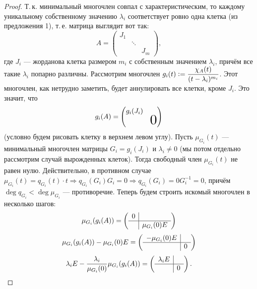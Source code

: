 \begin{proof}
    Т.\,к. минимальный многочлен совпал с характеристическим, то каждому уникальному собственному значению $\lambda_i$ соответствует ровно одна клетка (из предложения 1), т.\,е. матрица выглядит вот так:
    \[
        A =
        \begin{pmatrix}
            J_1 & & \\
             & \ddots & \\
             & & J_m
        \end{pmatrix},
    \]
    где $J_i$ --- жорданова клетка размером $m_i$ с собственным значением $\lambda_i$, причём все такие $\lambda_i$ попарно различны. Рассмотрим многочлен $\displaystyle g_i(t) \vcentcolon = \frac{\chi_A(t)}{(t - \lambda_i)^{m_i}}$. Этот многочлен, как нетрудно заметить, будет аннулировать все клетки, кроме $J_i$. Это значит, что
    \[
        g_i(A) =
        \begin{pmatrix}
            g_i(J_i) & \\
             & \scalebox{2}{$0$}
        \end{pmatrix}
    \]
    (условно будем рисовать клетку в верхнем левом углу). Пусть $\mu_{G_i}(t)$ --- минимальный многочлен матрицы $G_i = g_i(J_i)$ и $\lambda_i \ne 0$ (мы потом отдельно рассмотрим случай вырожденных клеток). Тогда свободный член $\mu_{G_i}(t)$ не равен нулю. Действительно, в противном случае $\mu_{G_i}(t) = q_{G_i}(t) \cdot t \Rightarrow q_{G_i}(G_i)G_i = 0 \Rightarrow q_{G_i}(G_i) = 0 G_i^{-1} = 0$, причём $\deg q_{G_i} < \deg \mu_{G_i}$ --- противоречие. Теперь будем строить искомый многочлен в несколько шагов:
    \[
        \mu_{G_i}(g_i(A)) =
        \left(
        \begin{array}{c | c}
            0 & \\
            \hline
             & \mu_{G_i}(0)E
        \end{array}
        \right)
    \]
    \[
        \mu_{G_i}(g_i(A)) - \mu_{G_i}(0)E =
        \left(
        \begin{array}{c | c}
            -\mu_{G_i}(0)E & \\
            \hline
             & 0
        \end{array}
        \right)
    \]
    \[
        \lambda_iE - \frac{\lambda_i}{\mu_{G_i}(0)}\mu_{G_i}(g_i(A)) =
        \left(
        \begin{array}{c | c}
            \lambda_iE & \\
            \hline
             & 0
        \end{array}
        \right).
    \]


\end{proof}
